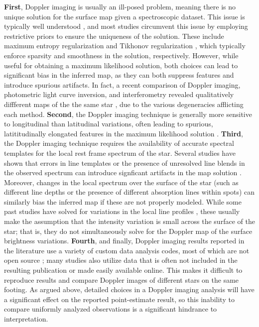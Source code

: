 \documentclass[modern]{aastex631}
\begin{document}
\textbf{First}, Doppler imaging is usually an ill-posed problem, meaning there is no unique solution for the surface map given a spectroscopic dataset.
This issue is typically well understood \citep[e.g.,][]{Piskunov1990,Rice2002}, and most studies circumvent this issue by employing restrictive priors to ensure the uniqueness of the solution. 
These include maximum entropy regularization \citep{Vogt1987} and Tikhonov regularization \citep[e.g.,][]{Piskunov1990}, which typically enforce sparsity and smoothness in the solution, respectively.
However, while useful for obtaining a maximum likelihood solution, both choices can lead to significant bias in the inferred map, as they can both suppress features and introduce spurious artifacts.
In fact, a recent comparison of Doppler imaging, photometric light curve inversion, and interferometry revealed qualitatively diffferent maps of the the same star \citep{Roettenbacher2017}, due to the various degeneracies afflicting each method.
%
\textbf{Second}, the Doppler imaging technique is generally more sensitive to longitudinal than latitudinal variations, often leading to spurious, latititudinally elongated features in the maximum likelihood solution \citep[e.g.,][]{Unruh1995,Crossfield2014b}.
%
\textbf{Third}, the Doppler imaging technique requires the availability of accurate spectral templates for the local rest frame spectrum of the star.
Several studies have shown that errors in line templates or the presence of unresolved line blends in the observed spectrum can introduce signficant artifacts in the map solution \citep[e.g.,][]{Rice1989,Unruh1995}.
Moreover, changes in the local spectrum over the surface of the star (such as different line depths or the presence of different absorption lines within spots) can similarly bias the inferred map if these are not properly modeled.
While some past studies have solved for variations in the local line profiles \citep{Khokhlova1976,Goncharskii1977,Goncharskii1982}, these usually make the assumption that the intensity variation is small across the surface of the star; that is, they do not simultaneously solve for the Doppler map of the surface brightness variations.
%
\textbf{Fourth}, and finally, Doppler imaging results reported in the literature use a variety of custom data analysis codes, most of which are not open source 
\citep[][to name a few]{Collier1997,Hackman2001,Carroll2012,Rosen2015,AsensioRamos2021}; %
many studies also utilize data that is often not included in the resulting publication or made easily available online. 
This makes it difficult to reproduce results and compare Doppler images of different stars on the same footing. 
As argued above, detailed choices in a Doppler imaging analysis will have a significant effect on the reported point-estimate result, so this inability to compare uniformly analyzed observations is a significant hindrance to interpretation.
\end{document}
